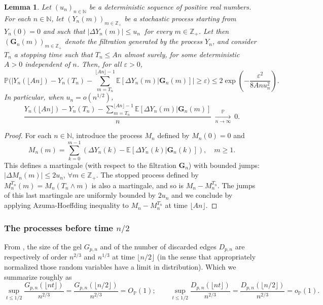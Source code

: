\documentclass[a4, 11pt]{article}
\numberwithin{equation}{section}
\theoremstyle{plain}
\newtheorem{lemma}[theorem]{Lemma}
\theoremstyle{definition}
\theoremstyle{remark}
\begin{document}
	\begin{lemma}\label{lm:approx:esp}
	Let $(u_n)_{n\in \mathbb N}$ be a deterministic sequence of positive real numbers. For each $n \in \mathbb N$, let $\left(Y_n(m)\right)_{m \in \mathbb Z_+}$ be a stochastic process starting from $Y_n(0)=0$ and such that $\left\vert \Delta Y_n(m)\right\vert \leq u_n~$ for every $m \in \mathbb Z_+$. Let then $(\mathbf{G}_n(m))_{m \in \mathbb Z_+}$ denote the filtration generated by the process $Y_n$, and consider $T_n$ a stopping time such that $T_n\leq An$ almost surely, for some deterministic $A>0$ independent of $n$. Then, for all $\varepsilon>0$,
	$$
\mathbb P\Bigg(\bigg|Y_n\left(\lfloor An\rfloor\right)-Y_n\left( T_n\right)-\sum_{m= T_n}^{\lfloor An\rfloor-1} \mathbb{E}\left[\Delta Y_n(m)|\mathbf{G}_n(m)\right]\bigg| \geq \varepsilon\Bigg) \leq 2 \exp\left(-\frac{\varepsilon^2}{8 An u_n^2} \right).
	$$
In particular, when $u_n=o(n^{1/2})$, 	
$$
\frac{Y_n\left(\lfloor An\rfloor\right)-Y_n\left( T_n\right)-\sum_{m= T_n}^{\lfloor An\rfloor-1} \mathbb{E}\left[\Delta Y_n(m)|\mathbf{G}_n(m) \right] }{n}~ \underset{n \rightarrow \infty}{\overset{\mathbb P}\longrightarrow}~ 0.
$$
\end{lemma}
\begin{proof}
	For each $n\in \mathbb N$, introduce the process $M_n$ defined by $M_n(0)=0$ and
	$$M_n(m)=\sum_{k=0}^{m-1}\left(\Delta Y_n(k)-\mathbb{E}\left[\Delta Y_n(k)|\mathbf{G}_n(k)\right]\right), \quad m\geq 1.$$
This defines a martingale (with respect to the filtration $\mathbf G_n$) with bounded jumps: $\left\vert \Delta M_n(m)\right\vert \leq 2u_n$, $\forall m \in \mathbb Z_+$.
The stopped process defined by $M_n^{T_n}(m)=M_n\left(T_n\wedge m\right)$ is also a martingale, and so is $M_n-M_n^{T_n}$. The jumps of this last martingale are uniformly bounded by $2u_n$ and we conclude by applying Azuma-Hoeffding inequality to $M_n-M_n^{T_n}$ at time $\lfloor An\rfloor$.
\end{proof}

\subsubsection{The processes  before time $n/2$}

From \cite{ContatCurien23,viau25}, the size of the gel $G_{p,n}$ and of the number of discarded edges $D_{p,n}$ are respectively of order $n^{2/3}$ and $n^{1/3}$ at time $\lfloor n/2 \rfloor$ (in the sense that appropriately normalized those random variables have a limit in distribution). Which we summarize roughly as
\begin{equation}
\label{bound1/2}
\sup_{t \leq 1/2} \frac{G_{p,n}(\lfloor nt \rfloor)}{n^{2/3}} = \frac{G_{p,n}(\lfloor n/2 \rfloor)}{n^{2/3}} =O_{\mathbb P}(1) ; \qquad \sup_{t \leq 1/2} \frac{D_{p,n}(\lfloor nt \rfloor)}{n^{2/3}} = \frac{D_{p,n}(\lfloor n/2 \rfloor)}{n^{2/3}}  =o_{\mathbb P}(1).
\end{equation}
\end{document}
